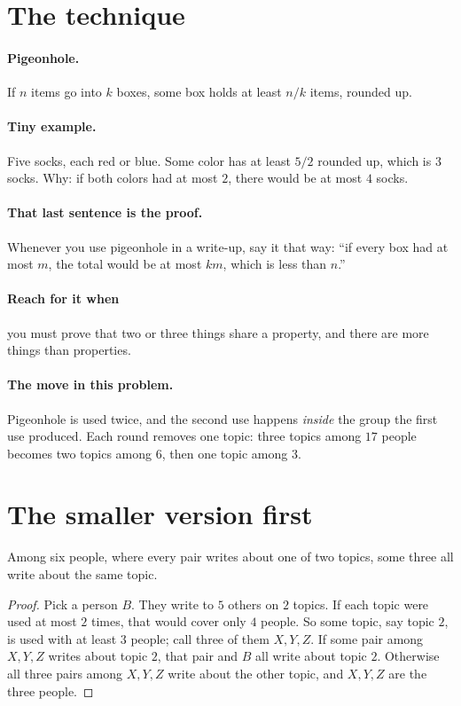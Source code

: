 \documentclass[11pt]{article}
\begin{document}

\section*{The technique}

\paragraph{Pigeonhole.} If $n$ items go into $k$ boxes, some box holds at least $n/k$ items, rounded up.

\paragraph{Tiny example.} Five socks, each red or blue. Some color has at least $5/2$ rounded up, which is $3$ socks. Why: if both colors had at most $2$, there would be at most $4$ socks.

\paragraph{That last sentence is the proof.} Whenever you use pigeonhole in a write-up, say it that way: ``if every box had at most $m$, the total would be at most $km$, which is less than $n$.''

\paragraph{Reach for it when} you must prove that two or three things share a property, and there are more things than properties.

\paragraph{The move in this problem.} Pigeonhole is used twice, and the second use happens \emph{inside} the group the first use produced. Each round removes one topic: three topics among $17$ people becomes two topics among $6$, then one topic among $3$.

\section*{The smaller version first}

\begin{claim}
Among six people, where every pair writes about one of two topics, some three all write about the same topic.
\end{claim}
\begin{proof}
Pick a person $B$. They write to $5$ others on $2$ topics. If each topic were used at most $2$ times, that would cover only $4$ people. So some topic, say topic $2$, is used with at least $3$ people; call three of them $X, Y, Z$. If some pair among $X, Y, Z$ writes about topic $2$, that pair and $B$ all write about topic $2$. Otherwise all three pairs among $X, Y, Z$ write about the other topic, and $X, Y, Z$ are the three people.
\end{proof}
\end{document}
